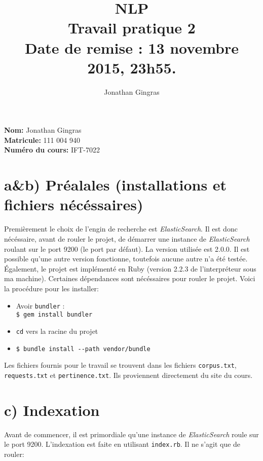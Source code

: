 \documentclass[12pt]{article}
\begin{document}
\title{NLP \\ Travail pratique 2 \\ Date de remise : 13 novembre 2015, 23h55.}
\author{Jonathan Gingras}

\maketitle

\begin{center}
\textbf{Nom:} Jonathan Gingras
\textbf{\\Matricule:} 111 004 940
\textbf{\\Numéro du cours:} IFT-7022
\end{center}

\clearpage


\section{a\&b) Préalales (installations et fichiers nécéssaires)}
Premièrement le choix de l'engin de recherche est \textit{ElasticSearch}. Il est donc nécéssaire, avant de rouler le projet, de démarrer une instance de \textit{ElasticSearch} roulant sur le port 9200 (le port par défaut). La version utilisée est 2.0.0. Il est possible qu'une autre version fonctionne, toutefois aucune autre n'a été testée.\\

Également, le projet est implémenté en Ruby (version 2.2.3 de l'interpréteur sous ma machine). Certaines dépendances sont nécéssaires pour rouler le projet. Voici la procédure pour les installer:\\

\begin{itemize}
\item Avoir \verb;bundler; :\\ \verb;$ gem install bundler;
\item \verb;cd; vers la racine du projet
\item \verb;$ bundle install --path vendor/bundle;\\
\end{itemize}

Les fichiers fournis pour le travail se trouvent dans les fichiers \verb;corpus.txt;, \verb;requests.txt; et \verb;pertinence.txt;. Ils proviennent directement du site du cours. 

\section{c) Indexation}
Avant de commencer, il est primordiale qu'une instance de \textit{ElasticSearch} roule sur le port 9200. L'indexation est faite en utilisant \verb;index.rb;. Il ne s'agit que de rouler:
\end{document}
